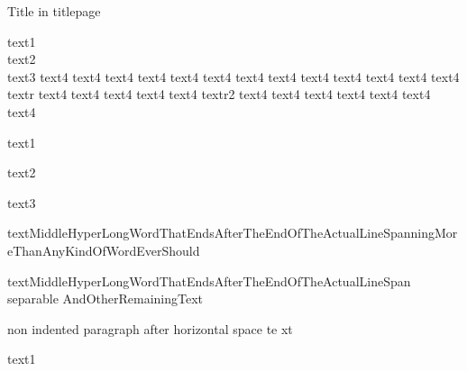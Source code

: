 \documentclass{article}
\begin{document}
    \begin{titlepage}
        Title in titlepage


    text1 \\ text2 \\[12pt] text3 \newline text4 text4 text4 text4 text4 
    text4 \linebreak text4 text4 text4 text4 text4 text4 text4 textr text4 
    text4 text4
    text4 text4 \nolinebreak textr2 text4 text4 text4 text4 text4 text4 text4 

    text1 \par text2

    text3

    textMiddleHyperLongWordThatEndsAfterTheEndOfTheActualLineSpanning\-MoreThanAnyKindOfWordEverShould

    textMiddleHyperLongWordThatEndsAfterTheEndOfTheActualLineSpan separable AndOtherRemainingText

    \noindent
    non indented paragraph \hspace{1cm} after horizontal space
    te \hfill xt
    \indent\indent

    \newpage text1

    \vspace{5cm}


\end{titlepage}
\end{document}
